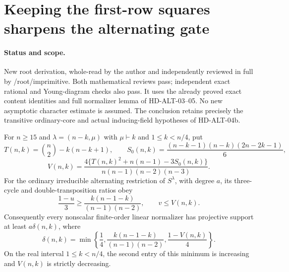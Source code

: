 \section{Keeping the first-row squares sharpens the alternating gate}
\label{sec:ordinary-alternating-87}

\paragraph{Status and scope.}
New root derivation, whole-read by the author and independently
reviewed in full by /root/imprimitive. Both mathematical reviews pass;
independent exact rational and Young-diagram checks also pass.
It uses the already proved exact content identities and full normalizer
lemma of HD-ALT-03--05. No new asymptotic character estimate is assumed.
The conclusion retains precisely the transitive ordinary-core and actual
inducing-field hypotheses of HD-ALT-04b.

\begin{lemma}
\label{HD-ALT-06a}
For $n\ge15$ and $\lambda=(n-k,\mu)$ with $\mu\vdash k$ and
$1\le k<n/4$, put
\[
 T(n,k)=\binom n2-k(n-k+1),\qquad
 S_0(n,k)=\frac{(n-k-1)(n-k)(2n-2k-1)}6,
\]
\[
 V(n,k)=\frac{4\{T(n,k)^2+n(n-1)-3S_0(n,k)\}}
                    {n(n-1)(n-2)(n-3)}.
                                                               \tag{ALT87.1}
\]
For the ordinary irreducible alternating restriction of $S^\lambda$,
with degree $a$, its three-cycle and double-transposition ratios obey
\[
 \frac{1-u}{3}\ge\frac{k(n-1-k)}{(n-1)(n-2)},\qquad
                         v\le V(n,k).                         \tag{ALT87.2}
\]
Consequently every nonscalar finite-order linear normalizer has
projective support at least $a\delta(n,k)$, where
\[
 \delta(n,k)=\min\left\{\frac14,
       \frac{k(n-1-k)}{(n-1)(n-2)},\frac{1-V(n,k)}4\right\}.
                                                               \tag{ALT87.3}
\]
On the real interval $1\le k<n/4$, the second entry of this minimum
is increasing and $V(n,k)$ is strictly decreasing.
\end{lemma}

